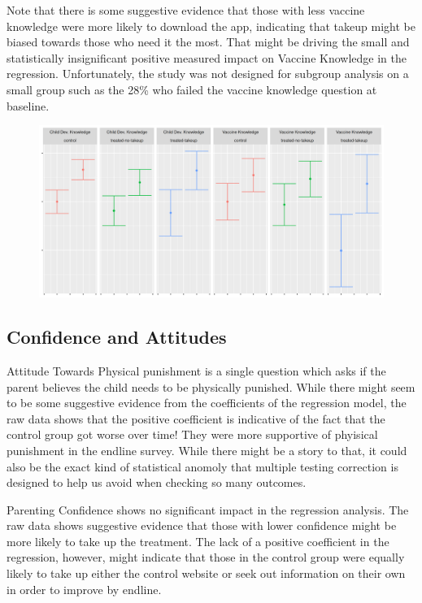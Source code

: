 \documentclass{article}
\begin{document}
Note that there is some suggestive evidence that those with less vaccine knowledge were more likely to download the app, indicating that takeup might be biased towards those who need it the most. That might be driving the small and statistically insignificant positive measured impact on Vaccine Knowledge in the regression. Unfortunately, the study was not designed for subgroup analysis on a small group such as the 28\% who failed the vaccine knowledge question at baseline.
\begin{figure}[H]
  \centering
\includegraphics[width=\textwidth]{plots/pre_post/Vaccine Knowledge.png}
\end{figure}


\subsection*{Confidence and Attitudes}

Attitude Towards Physical punishment is a single question which asks if the parent believes the child needs to be physically punished. While there might seem to be some suggestive evidence from the coefficients of the regression model, the raw data shows that the positive coefficient is indicative of the fact that the control group got worse over time! They were more supportive of phyisical punishment in the endline survey. While there might be a story to that, it could also be the exact kind of statistical anomoly that multiple testing correction is designed to help us avoid when checking so many outcomes.

Parenting Confidence shows no significant impact in the regression analysis. The raw data shows suggestive evidence that those with lower confidence might be more likely to take up the treatment. The lack of a positive coefficient in the regression, however, might indicate that those in the control group were equally likely to take up either the control website or seek out information on their own in order to improve by endline.
\end{document}
